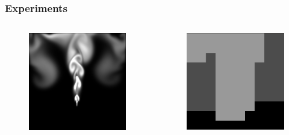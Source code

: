 \documentclass{beamer}\usetheme{Madrid} %
\begin{document}
\begin{frame}
\frametitle { Experiments } 
\begin{columns}
\begin{figure}
        \includegraphics[scale=0.28]{img/simulation.png}
\end{figure}
\begin{figure}
    \includegraphics[scale=0.28]{img/sim_grid.png}
\end{figure}
\end{columns}
\end{frame}
\end{document}
